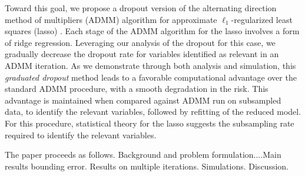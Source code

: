 Toward this goal, we propose a dropout version of the
alternating direction method of multipliers (ADMM) algorithm for
approximate $\ell_1$-regularized least squares (lasso) \cite{Boyd:2011}.  Each stage of
the ADMM algorithm for the lasso involves a form of ridge regression.
Leveraging our analysis of the dropout for this case, we gradually
decrease the dropout rate for variables identified as relevant in an
ADMM iteration.  As we demonstrate through both analysis and
simulation, this \textit{graduated dropout} method leads to a favorable
computational advantage over the standard ADMM procedure, with a
smooth degradation in the risk.  This advantage is maintained
when compared against ADMM run on subsampled data, to identify 
the relevant variables, followed by refitting of the reduced model.
For this procedure, statistical theory for the lasso suggests
the subsampling rate required to identify the relevant variables.

The paper proceeds as follows.  Background 
and problem formulation....Main results bounding
error.  Results on multiple iterations.  Simulations.
Discussion.

